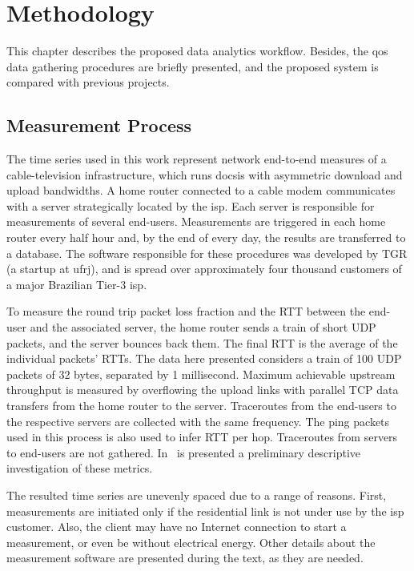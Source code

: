 \chapter{Methodology}
\label{chap:methodology}

This chapter describes the proposed data analytics workflow.
Besides, the \gls*{qos} data gathering procedures are briefly presented,
and the proposed system is compared with previous projects.

\section{Measurement Process}

The time series used in this work represent network end-to-end measures of a
cable-television infrastructure, which runs \gls*{docsis} with asymmetric download and
upload bandwidths. A home router connected to a cable modem communicates
with a server strategically located by the \gls*{isp}.
Each server is responsible for measurements of several end-users.
Measurements are triggered in
each home router every half hour and, by the end of every day,
the results are transferred to a database.
The software responsible for these procedures was
developed by TGR (a startup at \gls*{ufrj}),
and is spread over approximately four thousand customers of a major Brazilian
Tier-3 \gls*{isp}.

To measure the round
trip packet loss fraction and the RTT between the end-user and the associated
server, the home router sends a train of short UDP packets, and the server
bounces back them.
The final RTT is the average of the individual packets' RTTs.
The data here presented considers a train of 100 UDP packets of 32 bytes,
separated by 1 millisecond.
Maximum achievable upstream throughput is measured by overflowing the upload
links with parallel TCP data transfers from the home router to the server.
Traceroutes from the end-users to the respective servers are collected with
the same frequency.
The ping packets used in this process is also used to infer RTT per hop.
Traceroutes from servers to end-users are not gathered.
In~\cite{a_preliminary_performance_measurement_study_of_residential_broadband_services_in_brazil}
is presented a preliminary descriptive investigation of these metrics.

The resulted time series are unevenly spaced due to a range of reasons. First,
measurements are initiated only if the residential link is not under use by the
\gls*{isp} customer. Also, the client may have no Internet connection to start a
measurement, or even be without electrical energy. Other details about the
measurement software are presented during the text, as they are needed.


